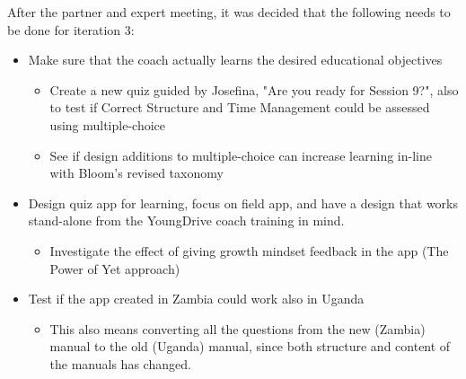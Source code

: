 After the partner and expert meeting, it was decided that the following needs to be done for iteration 3:

\begin{itemize}
  \item Make sure that the coach actually learns the desired educational objectives
  \begin{itemize}
    \item Create a new quiz guided by Josefina, "Are you ready for Session 9?", also to test if Correct Structure and Time Management could be assessed using multiple-choice
    \item See if design additions to multiple-choice can increase learning in-line with Bloom's revised taxonomy
  \end{itemize}
  \item Design quiz app for learning, focus on field app, and have a design that works stand-alone from the YoungDrive coach training in mind.
  \begin{itemize}
    \item Investigate the effect of giving growth mindset feedback in the app (The Power of Yet approach)
  \end{itemize}
  \item Test if the app created in Zambia could work also in Uganda
    \begin{itemize}
      \item This also means converting all the questions from the new (Zambia) manual to the old (Uganda) manual, since both structure and content of the manuals has changed.
    \end{itemize}
\end{itemize}
